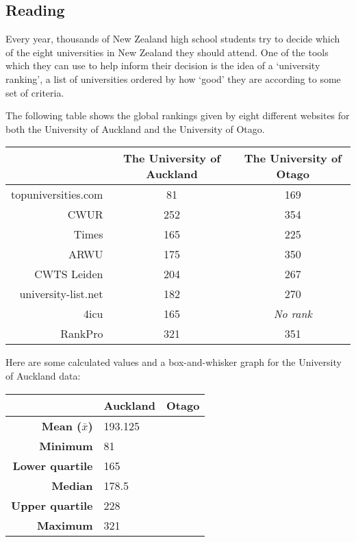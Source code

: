 



\subsection*{Reading}
Every year, thousands of New Zealand high school students try to decide which of the eight
universities in New Zealand they should attend. One of the tools which they can use to help
inform their decision is the idea of a `university ranking', a list of universities ordered
by how `good' they are according to some set of criteria.

The following table shows the global rankings given by eight different websites for both the University
of Auckland and the University of Otago.

\begin{table}[h]
  \begin{center}
    \begin{tabular}{|r|c|c|}
      \hline
      & \textbf{The University of Auckland} & \textbf{The University of Otago} \\
      \hline
      topuniversities.com & 81 & 169\\
      CWUR & 252 & 354\\
      Times & 165 & 225\\
      ARWU & 175 & 350\\
      CWTS Leiden & 204 & 267\\
      university-list.net & 182 & 270\\
      4icu & 165 & \textit{No rank}\\
      RankPro & 321 & 351\\
      \hline
    \end{tabular}
  \end{center}
\end{table}
Here are some calculated values and a box-and-whisker graph for the University of Auckland data:
\begin{table}[h]
  \makeatletter
  \fontsize{\f@size}{2em}\selectfont
  \makeatother
  \begin{center}
    \begin{tabular}{|r|l|c|}
      \hline
      & \textbf{Auckland} & \textbf{Otago}\\
      \hline
      \textbf{Mean ($ \bar x $)} & 193.125 & \hspace{0.4\linewidth} \ \\
      \textbf{Minimum} & 81 &\\
      \textbf{Lower quartile} & 165 &\\
      \textbf{Median} & 178.5 &\\
      \textbf{Upper quartile} & 228 &\\
      \textbf{Maximum} & 321 &\\
      \hline
    \end{tabular}
  \end{center}
\end{table}

